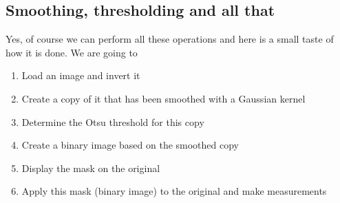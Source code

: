 \subsection{Smoothing, thresholding and all that}
Yes, of course we can perform all these operations and here is a small taste of how it is done.
We are going to

\begin{enumerate}
\item Load an image and invert it
\item Create a copy of it that has been smoothed with a Gaussian kernel
\item Determine the Otsu threshold for this copy
\item Create a binary image based on the smoothed copy
\item Display the mask on the original
\item Apply this mask (binary image) to the original and make measurements
\end{enumerate}